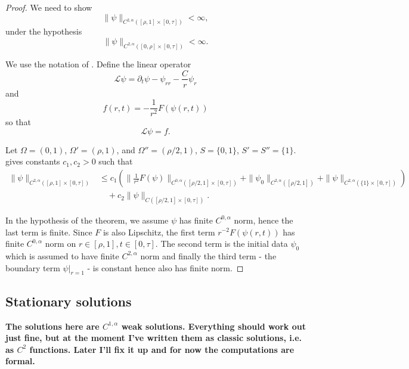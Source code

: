 \documentclass{amsart}
\begin{document}
\begin{proof}
We need to show
\[
\|\psi\|_{C^{2,\alpha}([\rho, 1] \times [0, \tau])} < \infty,
\]
under the hypothesis
\[
\|\psi\|_{C^{2,\alpha}([0, \rho] \times [0, \tau])} < \infty.
\]

We use the notation of \cite[Theorem 10.1]{Ladyzhenskaja:/1967}. Define the linear operator
\[
\mathcal{L} \psi = \partial_t \psi - \psi_{rr} - \frac{C}{r} \psi_r
\]
and
\[
f(r, t) = -\frac{1}{r^2} F(\psi(r, t))
\]
so that
\[
\mathcal{L} \psi = f.
\]

Let \(\Omega = (0, 1)\), \(\Omega' = (\rho, 1)\), and \(\Omega'' = (\rho/2, 1)\), \(S = \{0, 1\}\), \(S' = S'' = \{1\}\). \cite[Theorem 10.1]{Ladyzhenskaja:/1967} gives constants \(c_1, c_2 > 0\) such that
\[
\begin{split}
\|\psi\|_{C^{2,\alpha}([\rho, 1] \times [0, \tau])} &\leq c_1 \left(\|\tfrac{1}{r^2} F(\psi)\|_{C^{0,\alpha}([\rho/2, 1] \times [0, \tau])} + \|\psi_0\|_{C^{2,\alpha}([\rho/2, 1])} + \|\psi\|_{C^{2,\alpha}(\{1\} \times [0, \tau])} \right) \\
&\quad + c_2 \|\psi\|_{C([\rho/2, 1] \times [0, \tau])}.
\end{split}
\]

In the hypothesis of the theorem, we assume \(\psi\) has finite \(C^{0,\alpha}\) norm, hence the last term is finite. Since \(F\) is also Lipschitz, the first term \(r^{-2} F(\psi(r, t))\) has finite \(C^{0,\alpha}\) norm on \(r \in [\rho, 1], t \in [0, \tau]\). The second term is the initial data \(\psi_0\) which is assumed to have finite \(C^{2,\alpha}\) norm and finally the third term - the boundary term \(\psi|_{r=1}\) - is constant hence also has finite norm.
\end{proof}

\subsection{Stationary solutions}

\textbf{The solutions here are \(C^{1,\alpha}\) weak solutions. Everything should work out just fine, but at the moment I've written them as classic solutions, i.e. as \(C^2\) functions. Later I'll fix it up and for now the computations are formal.}
\end{document}
